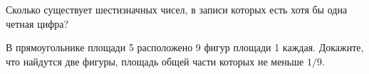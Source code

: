 %
%



\begin{problems}

\item
Сколько существует шестизначных чисел, в записи которых есть хотя бы одна
четная цифра?

\item
В прямоугольнике площади 5 расположено 9 фигур площади 1 каждая.
Докажите, что найдутся две фигуры, площадь общей части которых не меньше $1/9$.

\end{problems}

